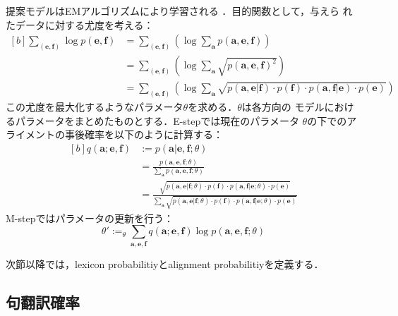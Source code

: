 \documentclass[japanese]{jnlp_1.4}
\newcommand{\argmax}{}
\begin{document}
提案モデルはEMアルゴリズムにより学習される
\cite{liang-taskar-klein:2006:HLT-NAACL06-Main}．目的関数として，与えら
れたデータに対する尤度を考える：
\begin{equation}
\begin{aligned}[b]
 \sum_{(\mathbf{e},\mathbf{f})} \log p(\mathbf{e}, \mathbf{f})
   & = \sum_{(\mathbf{e},\mathbf{f})}\left(\log \sum_{\mathbf{a}} p(\mathbf{a}, \mathbf{e}, \mathbf{f})\right)\\
   & = \sum_{(\mathbf{e},\mathbf{f})}\left(\log \sum_{\mathbf{a}} \sqrt{p(\mathbf{a}, \mathbf{e}, \mathbf{f})^2}\right)\\
   & = \sum_{(\mathbf{e},\mathbf{f})}\left(\log \sum_{\mathbf{a}} \sqrt{p(\mathbf{a},\mathbf{e}|\mathbf{f})\cdot p(\mathbf{f})\cdot p(\mathbf{a},\mathbf{f}|\mathbf{e})\cdot p(\mathbf{e})}\right)
\end{aligned}
\end{equation}
この尤度を最大化するようなパラメータ$\theta$を求める．$\theta$は各方向の
モデルにおけるパラメータをまとめたものとする．E-stepでは現在のパラメータ
$\theta$の下でのアライメントの事後確率を以下のように計算する：
\begin{equation}
\begin{aligned}[b]
  q(\mathbf{a}; \mathbf{e},\mathbf{f}) &:= p(\mathbf{a}|\mathbf{e},\mathbf{f};\theta) \\
    & = \frac{p(\mathbf{a}, \mathbf{e}, \mathbf{f}; \theta)}{\sum_{\mathbf{a}}p(\mathbf{a}, \mathbf{e}, \mathbf{f}; \theta)} \\[0.5em]
    & = \frac{\sqrt{p(\mathbf{a},\mathbf{e}|\mathbf{f};\theta) \cdot p(\mathbf{f}) \cdot p(\mathbf{a},\mathbf{f}|\mathbf{e};\theta)\cdot p(\mathbf{e})}}{\sum_{\mathbf{a}}\sqrt{p(\mathbf{a},\mathbf{e}|\mathbf{f};\theta) \cdot p(\mathbf{f}) \cdot p(\mathbf{a},\mathbf{f}|\mathbf{e};\theta)\cdot p(\mathbf{e})}}
\end{aligned}
\end{equation}
M-stepではパラメータの更新を行う：
\begin{equation}
 \theta' := \argmax_{\theta} \sum_{\mathbf{a},\mathbf{e},\mathbf{f}} q(\mathbf{a};\mathbf{e},\mathbf{f}) \log p(\mathbf{a},\mathbf{e},\mathbf{f};\theta)
\end{equation}


次節以降では，lexicon probabilitiyとalignment probabilitiyを定義する．


\subsection{句翻訳確率}
\end{document}
